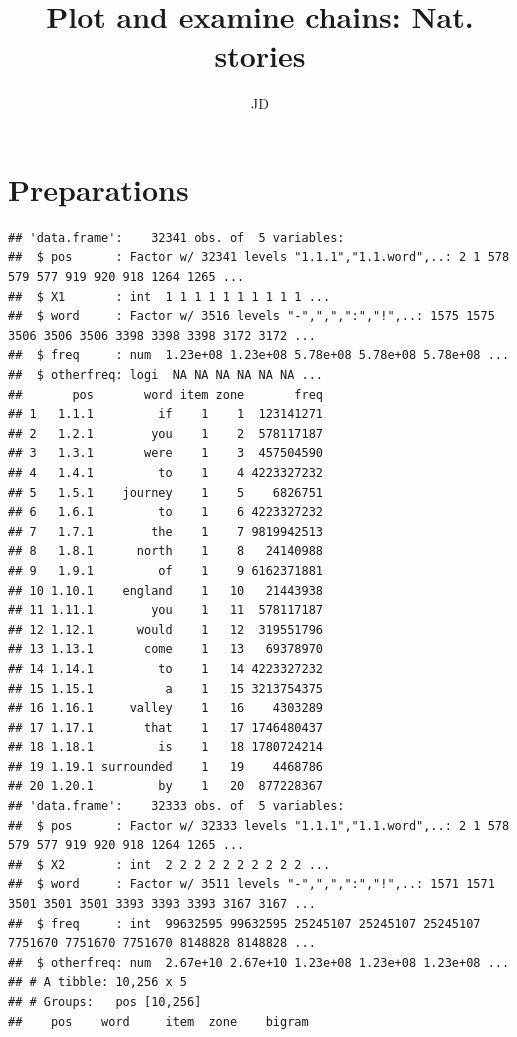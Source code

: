 \documentclass{article}\usepackage[]{graphicx}\usepackage[]{color}
\title{Plot and examine chains: Nat. stories}
\author{JD}
\makeatletter
\newenvironment{kframe}{%
 \def\at@end@of@kframe{}%
 \ifinner\ifhmode%
  \def\at@end@of@kframe{\end{minipage}}%
  \begin{minipage}{\columnwidth}%
 \fi\fi%
 \def\FrameCommand##1{\hskip\@totalleftmargin \hskip-\fboxsep
 \colorbox{shadecolor}{##1}\hskip-\fboxsep
     \hskip-\linewidth \hskip-\@totalleftmargin \hskip\columnwidth}%
 \MakeFramed {\advance\hsize-\width
   \@totalleftmargin\z@ \linewidth\hsize
   \@setminipage}}%
 {\par\unskip\endMakeFramed%
 \at@end@of@kframe}
\newenvironment{knitrout}{}{} %
\makeatother
\begin{document}
\maketitle

\section{Preparations}

\begin{knitrout}
\color{fgcolor}\begin{kframe}
\begin{verbatim}
## 'data.frame':	32341 obs. of  5 variables:
##  $ pos      : Factor w/ 32341 levels "1.1.1","1.1.word",..: 2 1 578 579 577 919 920 918 1264 1265 ...
##  $ X1       : int  1 1 1 1 1 1 1 1 1 1 ...
##  $ word     : Factor w/ 3516 levels "-",",",":","!",..: 1575 1575 3506 3506 3506 3398 3398 3398 3172 3172 ...
##  $ freq     : num  1.23e+08 1.23e+08 5.78e+08 5.78e+08 5.78e+08 ...
##  $ otherfreq: logi  NA NA NA NA NA NA ...
##       pos       word item zone       freq
## 1   1.1.1         if    1    1  123141271
## 2   1.2.1        you    1    2  578117187
## 3   1.3.1       were    1    3  457504590
## 4   1.4.1         to    1    4 4223327232
## 5   1.5.1    journey    1    5    6826751
## 6   1.6.1         to    1    6 4223327232
## 7   1.7.1        the    1    7 9819942513
## 8   1.8.1      north    1    8   24140988
## 9   1.9.1         of    1    9 6162371881
## 10 1.10.1    england    1   10   21443938
## 11 1.11.1        you    1   11  578117187
## 12 1.12.1      would    1   12  319551796
## 13 1.13.1       come    1   13   69378970
## 14 1.14.1         to    1   14 4223327232
## 15 1.15.1          a    1   15 3213754375
## 16 1.16.1     valley    1   16    4303289
## 17 1.17.1       that    1   17 1746480437
## 18 1.18.1         is    1   18 1780724214
## 19 1.19.1 surrounded    1   19    4468786
## 20 1.20.1         by    1   20  877228367
## 'data.frame':	32333 obs. of  5 variables:
##  $ pos      : Factor w/ 32333 levels "1.1.1","1.1.word",..: 2 1 578 579 577 919 920 918 1264 1265 ...
##  $ X2       : int  2 2 2 2 2 2 2 2 2 2 ...
##  $ word     : Factor w/ 3511 levels "-",",",":","!",..: 1571 1571 3501 3501 3501 3393 3393 3393 3167 3167 ...
##  $ freq     : int  99632595 99632595 25245107 25245107 25245107 7751670 7751670 7751670 8148828 8148828 ...
##  $ otherfreq: num  2.67e+10 2.67e+10 1.23e+08 1.23e+08 1.23e+08 ...
## # A tibble: 10,256 x 5
## # Groups:   pos [10,256]
##    pos    word     item  zone    bigram

\end{verbatim}
\end{kframe}
\end{knitrout}
\end{document}
